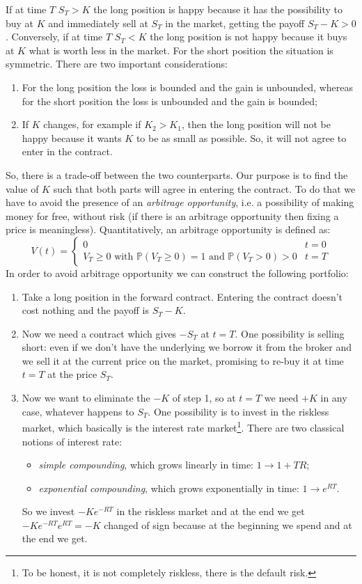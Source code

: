 If at time $T$ $S_T>K$ the long position is happy because it has the possibility to buy at $K$ and immediately sell at $S_T$ in the market, getting the payoff $S_T-K>0$. Conversely, if at time $T$ $S_T<K$ the long position is not happy because it buys at $K$ what is worth less in the market. For the short position the situation is symmetric. There are two important considerations:
\begin{enumerate}
    \item For the long position the loss is bounded and the gain is unbounded, whereas for the short position the loss is unbounded and the gain is bounded;
    \item If $K$ changes, for example if $K_2>K_1$, then the long position will not be happy because it wants $K$ to be as small as possible. So, it will not agree to enter in the contract.
\end{enumerate}
So, there is a trade-off between the two counterparts. Our purpose is to find the value of $K$ such that both parts will agree in entering the contract. To do that we have to avoid the presence of an \emph{arbitrage opportunity}, i.e. a possibility of making money for free, without risk (if there is an arbitrage opportunity then fixing a price is meaningless). Quantitatively, an arbitrage opportunity is defined as:
\begin{equation}
    V(t) = \begin{cases}
    0 & t = 0\\
    V_T\ge0 \mbox{ with } \mathbb{P}(V_T\ge0)=1 \mbox{ and } \mathbb{P}(V_T>0)>0 & t=T
    \end{cases}
\end{equation}
In order to avoid arbitrage opportunity we can construct the following portfolio:
\begin{enumerate}
    \item Take a long position in the forward contract. Entering the contract doesn't cost nothing and the payoff is $S_T-K$.
    \item Now we need a contract which gives $-S_T$ at $t=T$. One possibility is selling short: even if we don't have the underlying we borrow it from the broker and we sell it at the current price on the market, promising to re-buy it at time $t=T$ at the price $S_T$.
    \item Now we want to eliminate the $-K$ of step 1, so at $t=T$ we need $+K$ in any case, whatever happens to $S_T$. One possibility is to invest in the riskless market, which basically is the interest rate market\footnote{To be honest, it is not completely riskless, there is the default risk.}. There are two classical notions of interest rate:
    \begin{itemize}
        \item \emph{simple compounding}, which grows linearly in time: $1\to 1+TR$;
        \item \emph{exponential compounding}, which grows exponentially in time: $1\to e^{RT}$.
    \end{itemize}
    So we invest $-Ke^{-RT}$ in the riskless market and at the end we get $-Ke^{-RT}e^{RT}=-K$ changed of sign because at the beginning we spend and at the end we get.
\end{enumerate}
